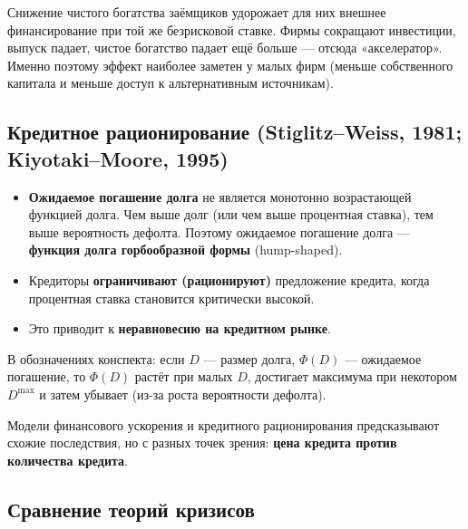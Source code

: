 \documentclass[10pt,a4paper]{article}
\begin{document}
\begin{intuition}
Снижение чистого богатства заёмщиков удорожает для них внешнее финансирование при той же безрисковой ставке. Фирмы сокращают инвестиции, выпуск падает, чистое богатство падает ещё больше — отсюда «акселератор». Именно поэтому эффект наиболее заметен у малых фирм (меньше собственного капитала и меньше доступ к альтернативным источникам).
\end{intuition}

\subsection{Кредитное рационирование (Stiglitz--Weiss, 1981; Kiyotaki--Moore, 1995)}

\begin{itemize}[leftmargin=1.3em]
\item \textbf{Ожидаемое погашение долга} не является монотонно возрастающей функцией долга. Чем выше долг (или чем выше процентная ставка), тем выше вероятность дефолта. Поэтому ожидаемое погашение долга — \textbf{функция долга горбообразной формы} (hump-shaped).
\item Кредиторы \textbf{ограничивают (рационируют)} предложение кредита, когда процентная ставка становится критически высокой.
\item Это приводит к \textbf{неравновесию на кредитном рынке}.
\end{itemize}

В обозначениях конспекта: если $D$ — размер долга, $\Phi(D)$ — ожидаемое погашение, то $\Phi(D)$ растёт при малых $D$, достигает максимума при некотором $D^{\max}$ и затем убывает (из-за роста вероятности дефолта).

Модели финансового ускорения и кредитного рационирования предсказывают схожие последствия, но с разных точек зрения: \textbf{цена кредита против количества кредита}.

\subsection{Сравнение теорий кризисов}
\end{document}
